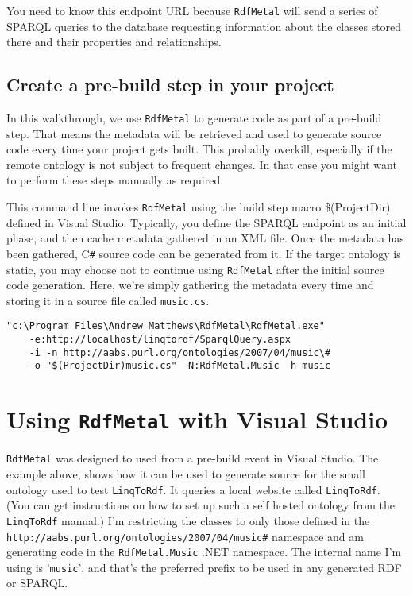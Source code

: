 \documentclass{article}
\newcommand{\cs}{C\texttt{\#}}
\def\spq{SPARQL}
\def\rm{\texttt{RdfMetal}}
\def\l2r{\texttt{LinqToRdf}}
\begin{document}
You need to know this endpoint URL because \rm{} will send a series of
\spq{} queries to the database requesting information about the classes stored
there and their properties and relationships.

\subsection{Create a pre-build step in your project}

In this walkthrough, we use \rm{} to generate code as part of a pre-build
step. That means the metadata will be retrieved and used to generate source
code every time your project gets built. This probably overkill, especially if
the remote ontology is not subject to frequent changes. In that case you might
want to perform these steps manually as required.

This command line invokes \rm{} using the build step macro \$(ProjectDir)
defined in Visual Studio.  Typically, you define the \spq{} endpoint as an
initial phase, and then cache metadata gathered in an XML file. Once the
metadata has been gathered, \cs{} source code can be generated from it. If the
target ontology is static, you may choose not to continue using \rm{} after the
initial source code generation. Here, we're simply gathering the metadata every
time and storing it in a source file called \texttt{music.cs}.

\begin{verbatim}
"c:\Program Files\Andrew Matthews\RdfMetal\RdfMetal.exe"
    -e:http://localhost/linqtordf/SparqlQuery.aspx
    -i -n http://aabs.purl.org/ontologies/2007/04/music\#
    -o "$(ProjectDir)music.cs" -N:RdfMetal.Music -h music
\end{verbatim}

\section{Using \rm{} with Visual Studio}
\rm{}  was designed to used from a pre-build event in Visual Studio. The example
above, shows how it can be used to generate source for the small ontology used
to test \l2r{}.  It queries a local website called \texttt{LinqToRdf}. (You
can get instructions on how to set up such a self hosted ontology from the
\l2r{} manual.) I'm restricting the classes to only those defined in the
\texttt{http://aabs.purl.org/ontologies/2007/04/music\#} namespace and am
generating code in the \texttt{RdfMetal.Music} .NET namespace. The internal name
I'm using is '\texttt{music}', and that's the preferred prefix to be used in any generated RDF or \spq{}.
\end{document}

